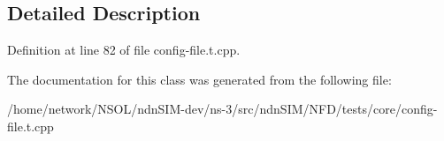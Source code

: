 \subsection{Detailed Description}


Definition at line 82 of file config-\/file.\+t.\+cpp.



The documentation for this class was generated from the following file\+:\begin{DoxyCompactItemize}
\item 
/home/network/\+N\+S\+O\+L/ndn\+S\+I\+M-\/dev/ns-\/3/src/ndn\+S\+I\+M/\+N\+F\+D/tests/core/config-\/file.\+t.\+cpp\end{DoxyCompactItemize}
